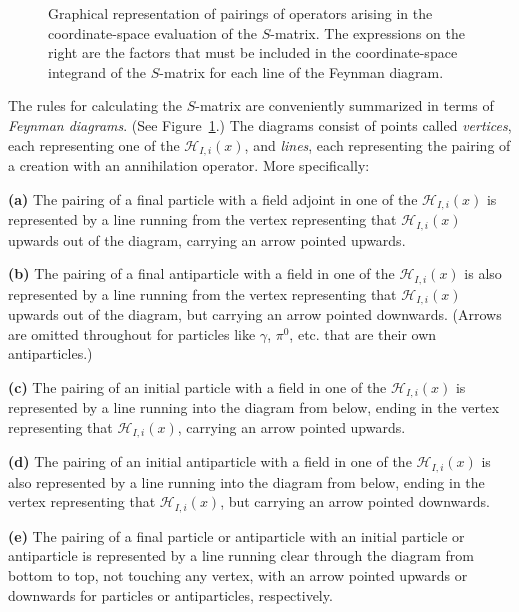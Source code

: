 \begingroup
\renewcommand{\thefigure}{6.\arabic{figure}}
\setcounter{figure}{0}
\begin{figure}[htbp]

\caption{Graphical representation of pairings of operators arising in the
coordinate-space evaluation of the $S$-matrix. The expressions on the right
are the factors that must be included in the coordinate-space integrand of the
$S$-matrix for each line of the Feynman diagram.}
\label{fig:6.1}
\end{figure}
\endgroup

The rules for calculating the $S$-matrix are conveniently summarized in terms
of \emph{Feynman diagrams}. (See Figure~\ref{fig:6.1}.) The diagrams consist of points
called \emph{vertices}, each representing one of the $\mathcal H_{I,i}(x)$, and
\emph{lines}, each representing the pairing of a creation with an annihilation
operator. More specifically:

\noindent\textbf{(a)} The pairing of a final particle with a field adjoint in
one of the $\mathcal H_{I,i}(x)$ is represented by a line running from the vertex
representing that $\mathcal H_{I,i}(x)$ upwards out of the diagram, carrying an
arrow pointed upwards.

\noindent\textbf{(b)} The pairing of a final antiparticle with a field in one
of the $\mathcal H_{I,i}(x)$ is also represented by a line running from the vertex
representing that $\mathcal H_{I,i}(x)$ upwards out of the diagram, but carrying
an arrow pointed downwards. (Arrows are omitted throughout for particles like
$\gamma$, $\pi^0$, etc. that are their own antiparticles.)

\noindent\textbf{(c)} The pairing of an initial particle with a field in one
of the $\mathcal H_{I,i}(x)$ is represented by a line running into the diagram from
below, ending in the vertex representing that $\mathcal H_{I,i}(x)$, carrying an
arrow pointed upwards.

\noindent\textbf{(d)} The pairing of an initial antiparticle with a field in
one of the $\mathcal H_{I,i}(x)$ is also represented by a line running into the
diagram from below, ending in the vertex representing that $\mathcal H_{I,i}(x)$,
but carrying an arrow pointed downwards.

\noindent\textbf{(e)} The pairing of a final particle or antiparticle with an
initial particle or antiparticle is represented by a line running clear
through the diagram from bottom to top, not touching any vertex, with an arrow
pointed upwards or downwards for particles or antiparticles, respectively.

